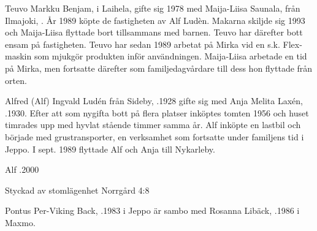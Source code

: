 Teuvo Markku Benjam,  i Laihela, gifte sig 1978 med Maija-Liisa Saunala, från Ilmajoki, . År 1989 köpte de fastigheten av Alf Ludèn. Makarna skiljde sig 1993 och Maija-Liisa flyttade bort tillsammans med barnen. Teuvo har därefter bott ensam på fastigheten. Teuvo har sedan 1989 arbetat på Mirka vid en s.k. Flex-maskin som mjukgör produkten inför användningen. Maija-Liisa arbetade en tid på Mirka, men fortsatte därefter som familjedagvårdare till dess hon flyttade från orten.
\begin{jhchildren}
  \item {}
  \item {}
  \item {}
  \item {}
\end{jhchildren}


Alfred (Alf) Ingvald Ludén från Sideby, .1928 gifte sig med Anja Melita Laxén, .1930. Efter att som nygifta bott på flera platser inköptes tomten 1956 och huset timrades upp med hyvlat stående timmer samma år. Alf inköpte en lastbil och började med grustransporter, en verksamhet som fortsatte under familjens tid i Jeppo. I sept. 1989 flyttade Alf och Anja till Nykarleby.
\begin{jhchildren}
  \item {}
  \item {}
\end{jhchildren}
Alf .2000



Styckad av stomlägenhet Norrgård 4:8



Pontus Per-Viking Back, .1983 i Jeppo är sambo med Rosanna Libäck, .1986 i Maxmo.
\begin{jhchildren}
  \item {}
  \item {}
\end{jhchildren}

